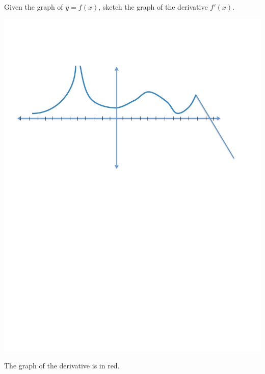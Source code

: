 \documentclass[nooutcomes]{ximera}
\begin{document}
\begin{problem}
Given the graph of $y=f(x)$, sketch the graph of the derivative $f'(x)$.

	\begin{image}
	\includegraphics[trim= 220 410 250 110]{Figure5.pdf}
	\end{image}

		\begin{freeResponse}
		The graph of the derivative is in red.
		

\end{freeResponse}
\end{problem}
\end{document}
